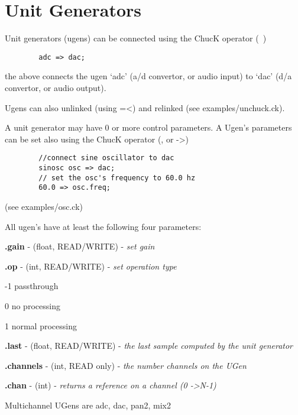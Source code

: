\chapter{Unit Generators}

Unit generators (ugens) can be connected using the ChucK operator (~\chuckop)

\example
\begin{verbatim}
        adc => dac;
\end{verbatim}

the above connects the ugen `adc' (a/d convertor, or audio input) to `dac'  
(d/a convertor, or audio output).

Ugens can also unlinked (using =\textless) and relinked (see examples/unchuck.ck). 

A unit generator may have 0 or more control parameters.  
A Ugen's parameters can be set also using the ChucK operator (\chuckop, or -\textgreater) 

\example

\begin{verbatim}
        //connect sine oscillator to dac
        sinosc osc => dac;
        // set the osc's frequency to 60.0 hz
        60.0 => osc.freq;
\end{verbatim}
  (see examples/osc.ck)

\newpage

All ugen's have at least the following four parameters:

\control
\begin{chuckitemize}
\item {\bf .gain} - (float, READ/WRITE) - {\it set gain} 
\item {\bf .op} - (int, READ/WRITE) - {\it set operation type }
  \begin{chuckitemize}
    \item -1 passthrough 
    \item 0 no processing 
    \item 1 normal processing
  \end{chuckitemize}
\item {\bf .last} - (float, READ/WRITE) - {\it the last sample computed by the unit generator}
\item {\bf .channels} - (int, READ only) - {\it the number channels on the UGen}
\item {\bf .chan} - (int) - {\it returns a reference on a channel (0 -\textgreater N-1)}
\end{chuckitemize}

Multichannel UGens are adc, dac, pan2, mix2

